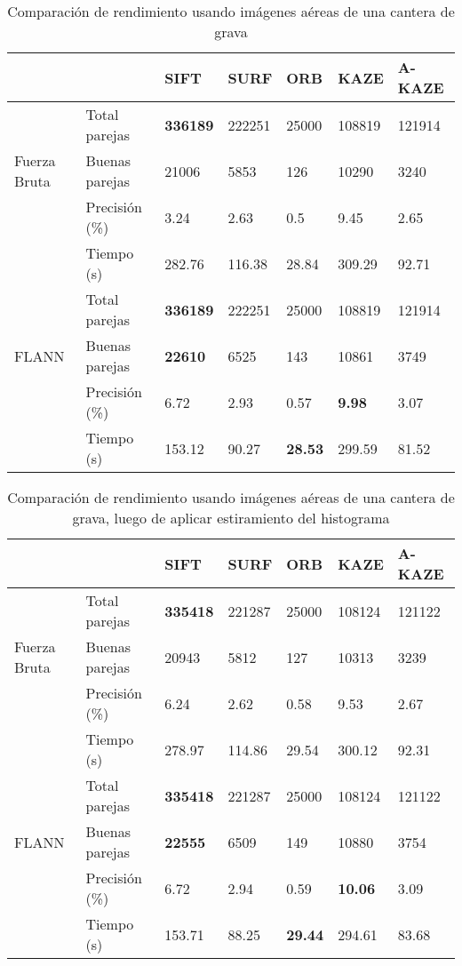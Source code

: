 \begin{table}[h]
	\centering
	\caption{Comparación de rendimiento usando imágenes aéreas de una cantera de grava}
	\label{geotagg}
	\begin{tabular}{@{}lllllll@{}}
		\toprule
		&                      				& SIFT 			& SURF & ORB & KAZE  & A-KAZE  \\ \midrule 
			   \hfill\vline& Total parejas  &\textbf{336189}& 222251&25000&108819& 121914   \\
		Fuerza Bruta \vline& Buenas parejas & 21006			& 5853 & 126 & 10290 & 3240  \\
			   \hfill\vline& Precisión (\%) & 3.24			&2.63  & 0.5   & 9.45& 2.65  \\
				\vspace{0.3cm}
			   \hfill\vline& Tiempo (s)     & 282.76		&116.38 & 28.84 &309.29 & 92.71   \\
		
			   \hfill\vline& Total parejas  &\textbf{336189}& 222251&25000			&108819				& 121914   \\
		FLANN  \hfill\vline& Buenas parejas &\textbf{22610} & 6525 & 143			& 10861				& 3749    \\
			   \hfill\vline& Precisión (\%) & 6.72			& 2.93 &0.57  			& \textbf{9.98} 	& 3.07    \\ 
			   \hfill\vline& Tiempo (s)     & 153.12		& 90.27& \textbf{28.53}	& 299.59			& 81.52   \\ 
		\bottomrule
	\end{tabular}
\end{table}
\begin{table}[h]
	\centering
	\caption{Comparación de rendimiento usando imágenes aéreas de una cantera de grava, luego de aplicar estiramiento del histograma}
	\label{geotagg-2}
	\begin{tabular}{@{}lllllll@{}}
		\toprule
		&                      				& SIFT 			& SURF & ORB & KAZE  & A-KAZE  \\ \midrule 
		\hfill\vline& Total parejas  &\textbf{335418}		& 221287&25000&108124& 121122   \\
		Fuerza Bruta \vline& Buenas parejas & 20943			& 5812 & 127 & 10313 & 3239  \\
		\hfill\vline& Precisión (\%) & 6.24			&2.62  & 0.58  & 9.53& 2.67  \\
		\vspace{0.3cm}
		\hfill\vline& Tiempo (s)     & 278.97		&114.86 & 29.54 &300.12 & 92.31   \\
		
		\hfill\vline& Total parejas  &\textbf{335418}& 221287&25000			&108124				& 121122   \\
		FLANN  \hfill\vline& Buenas parejas &\textbf{22555} & 6509 & 149	& 10880				& 3754    \\
		\hfill\vline& Precisión (\%) & 6.72			& 2.94 &0.59  			& \textbf{10.06} 	& 3.09   \\ 
		\hfill\vline& Tiempo (s)     & 153.71		& 88.25& \textbf{29.44}	& 294.61			& 83.68   \\ 
		\bottomrule
	\end{tabular}
\end{table}

